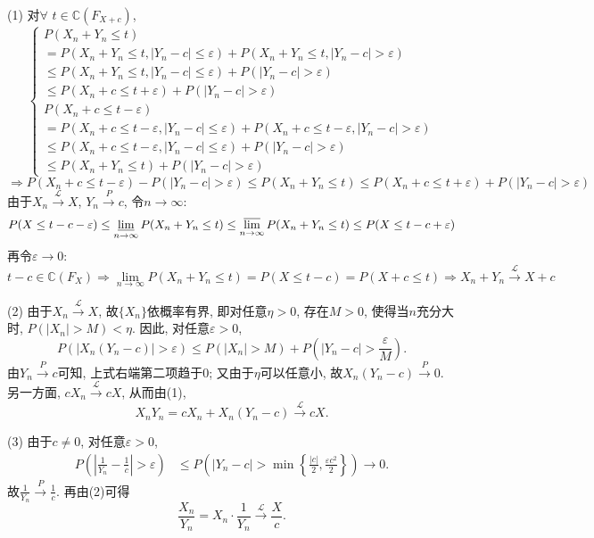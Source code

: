 \documentclass[standard]{ExBook}
\begin{document}
\begin{qitems}
(1) 对$\forall$ $t\in\mathbb{C}\left(F_{X+c}\right)$,
$$
    \left\{
    \begin{array}{l}
        P(X_n+Y_n\leq t)\\
        = P(X_n+Y_n\leq t,|Y_n-c|\leq \varepsilon)+P(X_n+Y_n\leq t,|Y_n-c|>\varepsilon)\\
        \leq P(X_n+Y_n\leq t,|Y_n-c|\leq \varepsilon)+P(|Y_n-c|>\varepsilon)\\
        \leq P(X_n+c\leq t+\varepsilon)+P(|Y_n-c|>\varepsilon)\\
        P(X_n+c\leq t-\varepsilon)\\
        = P(X_n+c\leq t-\varepsilon,|Y_n-c|\leq \varepsilon)+P(X_n+c\leq t-\varepsilon,|Y_n-c|> \varepsilon)\\
        \leq P(X_n+c\leq t-\varepsilon,|Y_n-c|\leq \varepsilon)+P(|Y_n-c|> \varepsilon)\\
        \leq P(X_n+Y_n\leq t)+P(|Y_n-c|>\varepsilon)
    \end{array}
    \right.
$$
$$\Longrightarrow P(X_n+c\leq t-\varepsilon)-P(|Y_n-c|>\varepsilon) \leq P(X_n+Y_n\leq t) \leq P(X_n+c\leq t+\varepsilon)+P(|Y_n-c|>\varepsilon)$$
由于$X_n\xrightarrow{\mathcal{L}}X$, $Y_n\xrightarrow{P}c$, 令$n\to\infty$:
$$P(X\leq t-c-\varepsilon) \leq \varliminf\limits_{n\to\infty}P(X_n+Y_n\leq t) \leq \varlimsup\limits_{n\to\infty}P(X_n+Y_n\leq t) \leq P(X\leq t-c+\varepsilon)$$
再令$\varepsilon\to0$:
$$t-c\in\mathbb{C}\left(F_{X}\right) \Longrightarrow \lim\limits_{n\to\infty}P(X_n+Y_n\leq t)=P(X\leq t-c)=P(X+c\leq t) \Longrightarrow X_n+Y_n\xrightarrow{\mathcal{L}}X+c$$

\vspace{2.5cm-5em}

(2) 由于$X_n\xrightarrow{\mathcal{L}}X$, 故$\{X_n\}$依概率有界, 即对任意$\eta>0$, 存在$M>0$, 使得当$n$充分大时, $P(|X_n|>M)<\eta$. 因此, 对任意$\varepsilon>0$,
$$
P\left(|X_n(Y_n-c)|>\varepsilon\right)
\leq P(|X_n|>M)
+P\left(|Y_n-c|>\frac{\varepsilon}{M}\right).
$$
由$Y_n\xrightarrow{P}c$可知, 上式右端第二项趋于$0$; 又由于$\eta$可以任意小, 故$X_n(Y_n-c)\xrightarrow{P}0$. 另一方面, $cX_n\xrightarrow{\mathcal{L}}cX$, 从而由(1),
$$
X_nY_n=cX_n+X_n(Y_n-c)\xrightarrow{\mathcal{L}}cX.
$$

(3) 由于$c\neq0$, 对任意$\varepsilon>0$,
$$
\begin{aligned}
P\left(\left|\frac{1}{Y_n}-\frac{1}{c}\right|>\varepsilon\right)
&\leq
P\left(
|Y_n-c|>
\min\left\{\frac{|c|}{2},\frac{\varepsilon c^2}{2}\right\}
\right)
\to0.
\end{aligned}
$$
故$\frac{1}{Y_n}\xrightarrow{P}\frac{1}{c}$. 再由(2)可得
$$
\frac{X_n}{Y_n}
=X_n\cdot\frac{1}{Y_n}
\xrightarrow{\mathcal{L}}\frac{X}{c}.
$$


\end{qitems}
\end{document}
